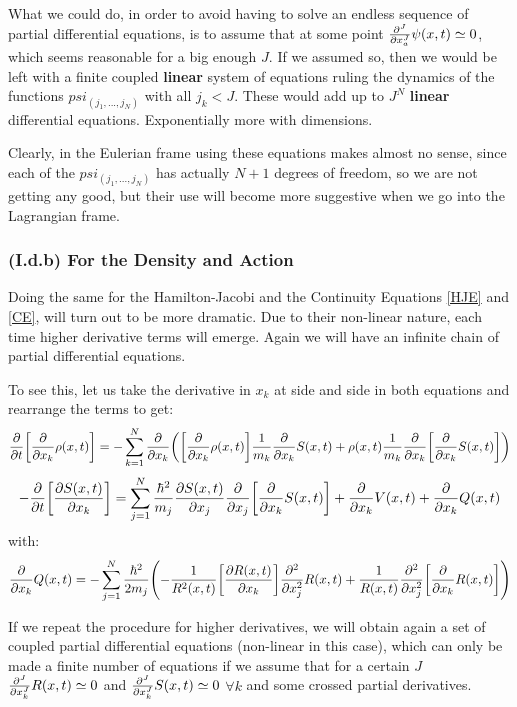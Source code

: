 \documentclass[11pt, a4paper]{article} %
\begin{document}
What we could do, in order to avoid having to solve an endless sequence of partial differential equations, is to assume that at some point $\pdv[J]{}{x_a}\psi(x,t)\simeq 0$, which seems reasonable for a big enough $J$. If we assumed so, then we would be left with a finite coupled {\bf linear} system of equations ruling the dynamics of the functions $psi_{(j_1,...,j_N)}$ with all $j_k<J$. These would add up to $J^N$ {\bf linear} differential equations. Exponentially more with dimensions.

Clearly, in the Eulerian frame using these equations makes almost no sense, since each of the $psi_{(j_1,...,j_N)}$ has actually $N+1$ degrees of freedom, so we are not getting any good, but their use will become more suggestive when we go into the Lagrangian frame.

\subsubsection*{(I.d.b) For the Density and Action}

Doing the same for the Hamilton-Jacobi and the Continuity Equations \eqref{HJE} and \eqref{CE}, will turn out to be more dramatic. Due to their non-linear nature, each time higher derivative terms will emerge. Again we will have an infinite chain of partial differential equations.

To see this, let us take the derivative in $x_k$ at side and side in both equations and rearrange the terms to get:
\begin{equation}
\pdv{}{t} \qty[\pdv{}{x_k}\rho(x,t)]=-\sum_{k=1}^N \pdv{}{x_k}\qty( \qty[ \pdv{}{x_k}\rho(x,t)]\frac{1}{m_k}\pdv{}{x_k} S(x,t)+\rho(x,t)\frac{1}{m_k}\pdv{}{x_k} \qty[\pdv{}{x_k}S(x,t)] )
\end{equation}
\begin{equation}
-\pdv{}{t}\qty[\pdv{S(x,t)}{x_k}] = \sum_{j=1}^N \frac{\hbar^2}{m_j}\pdv{S(x,t)}{x_j} \pdv{}{x_j}\qty[\pdv{}{x_k} S(x,t) ]+ \pdv{}{x_k}V(x,t)+\pdv{}{x_k}Q(x,t)
\end{equation}
with:
\begin{equation}
\pdv{}{x_k}Q(x,t)=-\sum_{j=1}^N \frac{\hbar^2}{2m_j}\qty( -\frac{1}{R^2(x,t)}\qty[\pdv{R(x,t)}{x_k}]\pdv[2]{}{x_j} R(x,t)+\frac{1}{R(x,t)}\pdv[2]{}{x_j} \qty[\pdv{}{x_k}R(x,t)])
\end{equation}

If we repeat the procedure for higher derivatives, we will obtain again a set of coupled partial differential equations (non-linear in this case), which can only be made a finite number of equations if we assume that for a certain $J$ $\pdv[J]{}{x_k}R(x,t)\simeq 0$ and $\pdv[J]{}{x_k}S(x,t)\simeq 0$ $\forall k$ and some crossed partial derivatives.
\end{document}
